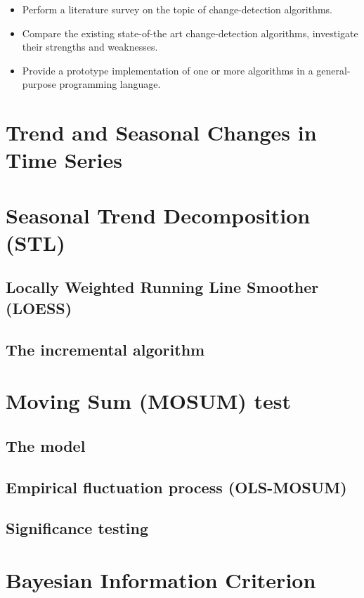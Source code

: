 \documentclass[a4paper]{article}
\begin{document}
\begin{itemize}
\item Perform a literature survey on the topic of
change-detection algorithms.
\item Compare the existing state-of-the art
change-detection algorithms, investigate their strengths and weaknesses.
\item Provide a prototype implementation of one or more algorithms in a
general-purpose programming language.
\end{itemize}

\section{Trend and Seasonal Changes in Time Series}
\label{sec:trend_and_seasonal_changes_in_time_series}

\section{Seasonal Trend Decomposition (STL)}
\label{sec:seasonal_trend_decomposition_using_loess}
\subsection{Locally Weighted Running Line Smoother (LOESS)}
\label{subsec:locally_weighted_running_line_smoother}
\subsection{The incremental algorithm}
\label{subsec:the_incremental_algorithm}

\section{Moving Sum (MOSUM) test}
\subsection{The model}
\subsection{Empirical fluctuation process (OLS-MOSUM)}
\subsection{Significance testing}

\section{Bayesian Information Criterion}
\label{sec:bayesian_information_criterion}
\end{document}
